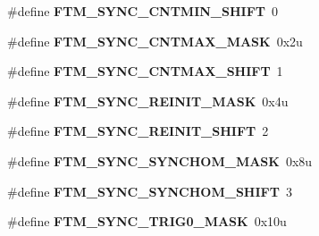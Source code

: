 \begin{DoxyCompactItemize}
\item 
\#define {\bfseries F\+T\+M\+\_\+\+S\+Y\+N\+C\+\_\+\+C\+N\+T\+M\+I\+N\+\_\+\+S\+H\+I\+FT}~0\hypertarget{group__FTM__Register__Masks_gacdc3ce84e897d0dd03b6ff7c483a6e4f}{}\label{group__FTM__Register__Masks_gacdc3ce84e897d0dd03b6ff7c483a6e4f}

\item 
\#define {\bfseries F\+T\+M\+\_\+\+S\+Y\+N\+C\+\_\+\+C\+N\+T\+M\+A\+X\+\_\+\+M\+A\+SK}~0x2u\hypertarget{group__FTM__Register__Masks_gae6aedee28d8bdb29e4f4a309e85ccdb0}{}\label{group__FTM__Register__Masks_gae6aedee28d8bdb29e4f4a309e85ccdb0}

\item 
\#define {\bfseries F\+T\+M\+\_\+\+S\+Y\+N\+C\+\_\+\+C\+N\+T\+M\+A\+X\+\_\+\+S\+H\+I\+FT}~1\hypertarget{group__FTM__Register__Masks_gad9a59cf6ab219dcb7f646d74e599ddb4}{}\label{group__FTM__Register__Masks_gad9a59cf6ab219dcb7f646d74e599ddb4}

\item 
\#define {\bfseries F\+T\+M\+\_\+\+S\+Y\+N\+C\+\_\+\+R\+E\+I\+N\+I\+T\+\_\+\+M\+A\+SK}~0x4u\hypertarget{group__FTM__Register__Masks_gafae9d365874a8b4adc13ccc1a3873b6a}{}\label{group__FTM__Register__Masks_gafae9d365874a8b4adc13ccc1a3873b6a}

\item 
\#define {\bfseries F\+T\+M\+\_\+\+S\+Y\+N\+C\+\_\+\+R\+E\+I\+N\+I\+T\+\_\+\+S\+H\+I\+FT}~2\hypertarget{group__FTM__Register__Masks_gaf3a51fedf11a10a6793f9df11ca77e87}{}\label{group__FTM__Register__Masks_gaf3a51fedf11a10a6793f9df11ca77e87}

\item 
\#define {\bfseries F\+T\+M\+\_\+\+S\+Y\+N\+C\+\_\+\+S\+Y\+N\+C\+H\+O\+M\+\_\+\+M\+A\+SK}~0x8u\hypertarget{group__FTM__Register__Masks_ga1393ccaf9753328f3b3b65cf28f6804f}{}\label{group__FTM__Register__Masks_ga1393ccaf9753328f3b3b65cf28f6804f}

\item 
\#define {\bfseries F\+T\+M\+\_\+\+S\+Y\+N\+C\+\_\+\+S\+Y\+N\+C\+H\+O\+M\+\_\+\+S\+H\+I\+FT}~3\hypertarget{group__FTM__Register__Masks_ga9f4fbe85603aa455463585444e27dbb3}{}\label{group__FTM__Register__Masks_ga9f4fbe85603aa455463585444e27dbb3}

\item 
\#define {\bfseries F\+T\+M\+\_\+\+S\+Y\+N\+C\+\_\+\+T\+R\+I\+G0\+\_\+\+M\+A\+SK}~0x10u\hypertarget{group__FTM__Register__Masks_ga5ee32a648ec1a88f07ea32b9a680684b}{}\label{group__FTM__Register__Masks_ga5ee32a648ec1a88f07ea32b9a680684b}


\end{DoxyCompactItemize}

